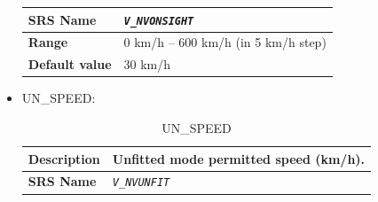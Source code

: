 \documentclass{template/openetcs}
\begin{document}
\begin{itemize}
\begin{longtable}{|l|l|}
				\hline
				
					\begin{minipage}[t]{0.22\linewidth} \textbf{SRS Name}	\end{minipage} 
				&	\begin{minipage}[t]{0.78\linewidth} \emph{\texttt{V\_NVONSIGHT}} \end{minipage} \\
				
				\hline
														
					\begin{minipage}[t]{0.22\linewidth} \textbf{Range}	\end{minipage} 
				&	\begin{minipage}[t]{0.78\linewidth} 0 km/h – 600 km/h (in 5 km/h step) \end{minipage} \\
				
				\hline
										
					\begin{minipage}[t]{0.22\linewidth} \textbf{Default value}	\end{minipage} 
				&	\begin{minipage}[t]{0.78\linewidth} 30 km/h \end{minipage} \\
				
				\hline
				
			\end{longtable}			 
			
		\item UN\_SPEED:
			\begin{longtable}{|l|l|}
				\caption{UN\_SPEED}\\ 										
				\hline
				
					\begin{minipage}[t]{0.22\linewidth} \textbf{Description}	\end{minipage} 
				&	\begin{minipage}[t]{0.78\linewidth} Unfitted mode permitted speed (km/h). \end{minipage} \\
				
				\hline
				
					\begin{minipage}[t]{0.22\linewidth} \textbf{SRS Name}	\end{minipage} 
				&	\begin{minipage}[t]{0.78\linewidth} \emph{\texttt{V\_NVUNFIT}} \end{minipage} \\
				

\end{longtable}
\end{itemize}
\end{document}
